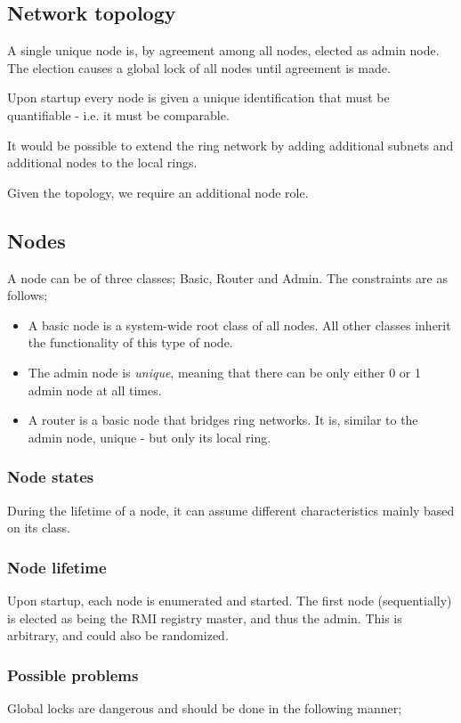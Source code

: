 \documentclass[10pt,a4paper]{article}
\begin{document}
\subsection{Network topology}
\label{network_topology}
A single unique node is, by agreement among all nodes, elected as admin node. The election causes a global lock of all nodes until agreement is made.

Upon startup every node is given a unique identification that must be quantifiable - i.e. it must be comparable.

It would be possible to extend the ring network by adding additional subnets and additional nodes to the local rings.

Given the topology, we require an additional node role.

\subsection{Nodes}
A node can be of three classes; Basic, Router and Admin. The constraints are as follows;
\begin{itemize}
\item A basic node is a system-wide root class of all nodes. All other classes inherit the functionality of this type of node.
\item The admin node is \emph{unique}, meaning that there can be only either 0 or 1 admin node at all times.
\item A router is a basic node that bridges ring networks. It is, similar to the admin node, unique - but only its local ring.
\end{itemize}


\subsubsection{Node states}
During the lifetime of a node, it can assume different characteristics mainly based on its class.

\subsubsection{Node lifetime}
Upon startup, each node is enumerated and started. The first node (sequentially) is elected as being the RMI registry master, and thus the admin. This is arbitrary, and could also be randomized.

\subsubsection{Possible problems}
Global locks are dangerous and should be done in the following manner; 
\end{document}
